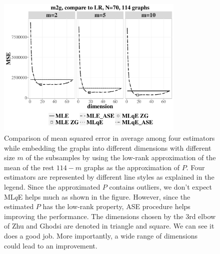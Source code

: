\documentclass[a4paper]{article}
\begin{document}
\begin{itemize}
\begin{figure}
\centering
\includegraphics[width=0.8\textwidth]{CCI_CompareLR.pdf}
\caption{Comparison of mean squared error in average among four estimators while embedding the graphs into different dimensions with different size $m$ of the subsamples by using the low-rank approximation of the mean of the rest $114 - m$ graphs as the approximation of $P$. Four estimators are represented by different line styles as explained in the legend. Since the approximated $P$ contains outliers, we don't expect ML$q$E helps much as shown in the figure. However, since the estimated $P$ has the low-rank property, ASE procedure helps improving the performance. The dimensions chosen by the 3rd elbow of Zhu and Ghodsi are denoted in triangle and square. We can see it does a good job. More importantly, a wide range of dimensions could lead to an improvement.}
\label{fig:CCI_LR}
\end{figure}


\end{itemize}
\end{document}
